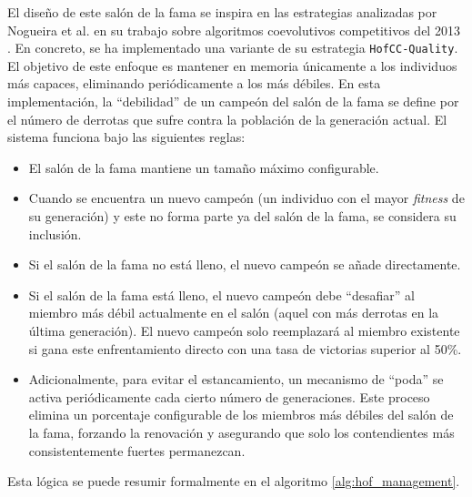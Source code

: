 El diseño de este salón de la fama se inspira en las estrategias analizadas por Nogueira et al. en su trabajo sobre algoritmos coevolutivos competitivos del 2013 \cite{mariela_nogueira_analysis_2013}. En concreto, se ha implementado una variante de su estrategia \texttt{HofCC-Quality}. El objetivo de este enfoque es mantener en memoria únicamente a los individuos más capaces, eliminando periódicamente a los más débiles. En esta implementación, la ``debilidad'' de un campeón del salón de la fama se define por el número de derrotas que sufre contra la población de la generación actual. El sistema funciona bajo las siguientes reglas:

\begin{itemize}
	\item El salón de la fama mantiene un tamaño máximo configurable.
	\item Cuando se encuentra un nuevo campeón (un individuo con el mayor \textit{fitness} de su generación) y este no forma parte ya del salón de la fama, se considera su inclusión.
	\item Si el salón de la fama no está lleno, el nuevo campeón se añade directamente.
	\item Si el salón de la fama está lleno, el nuevo campeón debe ``desafiar'' al miembro más débil actualmente en el salón (aquel con más derrotas en la última generación). El nuevo campeón solo reemplazará al miembro existente si gana este enfrentamiento directo con una tasa de victorias superior al 50\%.
	\item Adicionalmente, para evitar el estancamiento, un mecanismo de ``poda'' se activa periódicamente cada cierto número de generaciones. Este proceso elimina un porcentaje configurable de los miembros más débiles del salón de la fama, forzando la renovación y asegurando que solo los contendientes más consistentemente fuertes permanezcan.
\end{itemize}

Esta lógica se puede resumir formalmente en el algoritmo \ref{alg:hof_management}.

